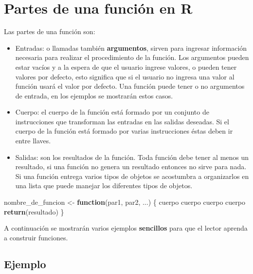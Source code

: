 \documentclass[10pt,]{krantz}
\makeatletter
\newenvironment{Shaded}{\begin{snugshade}}{\end{snugshade}}
\newcommand{\KeywordTok}[1]{\textcolor[rgb]{0.13,0.29,0.53}{\textbf{#1}}}
\newcommand{\StringTok}[1]{\textcolor[rgb]{0.31,0.60,0.02}{#1}}
\newcommand{\ControlFlowTok}[1]{\textcolor[rgb]{0.13,0.29,0.53}{\textbf{#1}}}
\newcommand{\NormalTok}[1]{#1}
\providecommand{\tightlist}{%
  \setlength{\itemsep}{0pt}\setlength{\parskip}{0pt}}
\newenvironment{kframe}{%
\medskip{}
\setlength{\fboxsep}{.8em}
 \def\at@end@of@kframe{}%
 \ifinner\ifhmode%
  \def\at@end@of@kframe{\end{minipage}}%
  \begin{minipage}{\columnwidth}%
 \fi\fi%
 \def\FrameCommand##1{\hskip\@totalleftmargin \hskip-\fboxsep
 \colorbox{shadecolor}{##1}\hskip-\fboxsep
     \hskip-\linewidth \hskip-\@totalleftmargin \hskip\columnwidth}%
 \MakeFramed {\advance\hsize-\width
   \@totalleftmargin\z@ \linewidth\hsize
   \@setminipage}}%
 {\par\unskip\endMakeFramed%
 \at@end@of@kframe}
\renewenvironment{Shaded}{\begin{kframe}}{\end{kframe}}
\makeatother
\begin{document}
\section{\texorpdfstring{Partes de una función en R
}{Partes de una función en R }}\label{partes-de-una-funcion-en-r}

Las partes de una función son:

\begin{itemize}
\tightlist
\item
  Entradas: o llamadas también \textbf{argumentos}, sirven para ingresar
  información necesaria para realizar el procedimiento de la función.
  Los argumentos pueden estar vacíos y a la espera de que el usuario
  ingrese valores, o pueden tener valores por defecto, esto significa
  que si el usuario no ingresa una valor al función usará el valor por
  defecto. Una función puede tener o no argumentos de entrada, en los
  ejemplos se mostrarán estos casos.
\item
  Cuerpo: el cuerpo de la función está formado por un conjunto de
  instrucciones que transforman las entradas en las salidas deseadas. Si
  el cuerpo de la función está formado por varias instrucciones éstas
  deben ir entre llaves.
\item
  Salidas: son los resultados de la función. Toda función debe tener al
  menos un resultado, si una función no genera un resultado entonces no
  sirve para nada. Si una función entrega varios tipos de objetos se
  acostumbra a organizarlos en una lista que puede manejar los
  diferentes tipos de objetos.
\end{itemize}

\begin{Shaded}
\begin{Highlighting}[]
\NormalTok{nombre_de_funcion <-}\StringTok{ }\ControlFlowTok{function}\NormalTok{(par1, par2, ...) \{}
\NormalTok{  cuerpo}
\NormalTok{  cuerpo}
\NormalTok{  cuerpo}
\NormalTok{  cuerpo}
  \KeywordTok{return}\NormalTok{(resultado)}
\NormalTok{\}}
\end{Highlighting}
\end{Shaded}

A continuación se mostrarán varios ejemplos \textbf{sencillos} para que
el lector aprenda a construir funciones.

\subsection*{Ejemplo}\label{ejemplo-20}
\end{document}
